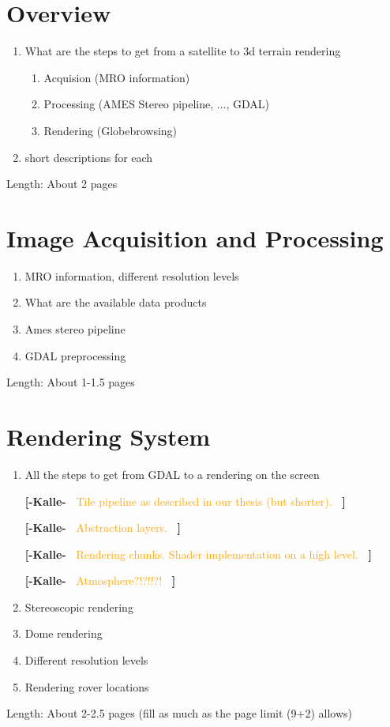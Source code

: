 \documentclass[journal]{vgtc}                %
\newcommand{\kallecomment}[1]{\textbf{[-Kalle-~}
    \textcolor{orange}{#1}
    \textbf{~]}}
\begin{document}
\section{Overview} \label{sec:overview}



\begin{enumerate}
  \item What are the steps to get from a satellite to 3d terrain rendering
\begin{enumerate}
  \item Acquision (MRO information)
  \item Processing (AMES Stereo pipeline, ..., GDAL)
  \item Rendering (Globebrowsing)
\end{enumerate}
  \item short descriptions for each
\end{enumerate}
Length: About 2 pages

\section{Image Acquisition and Processing} \label{sec:imageacquisitionprocessing}
\begin{enumerate}
  \item MRO information, different resolution levels
  \item What are the available data products
  \item Ames stereo pipeline
  \item GDAL preprocessing
\end{enumerate}
Length: About 1-1.5 pages

\section{Rendering System} \label{sec:renderingsystem}


\begin{enumerate}
  \item All the steps to get from GDAL to a rendering on the screen
  
  \kallecomment{Tile pipeline as described in our thesis (but shorter).}
  
  \kallecomment{Abstraction layers.}
  
  \kallecomment{Rendering chunks. Shader implementation on a high level.}
  
  \kallecomment{Atmosphere?!?!!?!}
  
  \item Stereoscopic rendering
  \item Dome rendering
  \item Different resolution levels
  \item Rendering rover locations
\end{enumerate}
Length: About 2-2.5 pages (fill as much as the page limit (9+2) allows)
\end{document}
